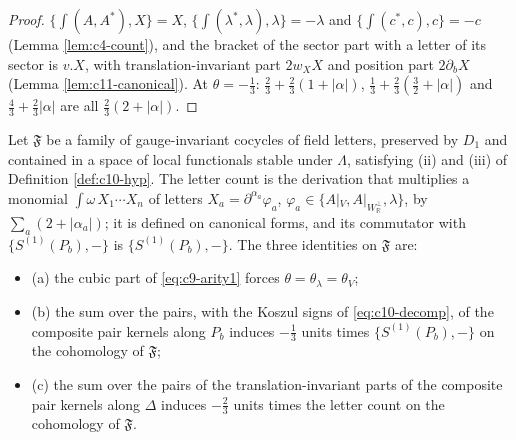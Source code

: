 \begin{proof}
$\{\int(A,A^*),X\}=X$, $\{\int(\lambda^*,\lambda),\lambda\}=-\lambda$ and $\{\int(c^*,c),c\}=-c$ (Lemma \ref{lem:c4-count}), and the bracket of the sector part with a letter of its sector is $v.X$, with translation-invariant part $2w_XX$ and position part $2\partial_bX$ (Lemma \ref{lem:c11-canonical}). At $\theta=-\tfrac13$: $\tfrac23+\tfrac23(1+|\alpha|)$, $\tfrac13+\tfrac23(\tfrac32+|\alpha|)$ and $\tfrac43+\tfrac23|\alpha|$ are all $\tfrac23(2+|\alpha|)$.
\end{proof}

\begin{definition}
\label{def:c11-P7}
Let $\mathfrak F$ be a family of gauge-invariant cocycles of field letters, preserved by $D_1$ and contained in a space of local functionals stable under $\Lambda$, satisfying (ii) and (iii) of Definition \ref{def:c10-hyp}. The letter count is the derivation that multiplies a monomial $\int\omega\,X_1\cdots X_n$ of letters $X_a=\partial^{\alpha_a}\varphi_a$, $\varphi_a\in\{A|_V,A|_{W_{\mathbb R}^\perp},\lambda\}$, by $\sum_a(2+|\alpha_a|)$; it is defined on canonical forms, and its commutator with $\{S^{(1)}(P_b),-\}$ is $\{S^{(1)}(P_b),-\}$. The three identities on $\mathfrak F$ are:
\begin{itemize}
\item (a) the cubic part of \eqref{eq:c9-arity1} forces $\theta=\theta_\lambda=\theta_V$;
\item (b) the sum over the pairs, with the Koszul signs of \eqref{eq:c10-decomp}, of the composite pair kernels along $P_b$ induces $-\tfrac13$ units times $\{S^{(1)}(P_b),-\}$ on the cohomology of $\mathfrak F$;
\item (c) the sum over the pairs of the translation-invariant parts of the composite pair kernels along $\Delta$ induces $-\tfrac23$ units times the letter count on the cohomology of $\mathfrak F$.
\end{itemize}
\end{definition}

